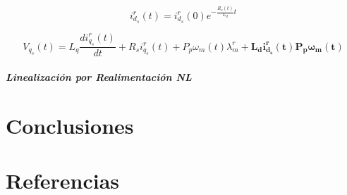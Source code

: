 \documentclass{article}
\begin{document}
\begin{enumerate}[label=\roman*.]
    \begin{equation}
        i_{d_{s}}^r(t) = i_{d_{s}}^r(0)e^{-\frac{R_{s}(t)}{L_{d}}t}
    \end{equation}

    \begin{equation}
        V_{q_{s}}(t) = L_{q}\frac{di_{q_{s}}^r(t)}{dt} + R_{s}i_{q_{s}}^r(t) + P_{p}\omega_{m}(t)\lambda_{m}^r + \mathbf{L_{d}i_{d_{s}}^r(t)P_{p}\omega_{m}(t)}
    \end{equation}

\end{enumerate}


\subsubsection*{Linealización por Realimentación NL}

\newpage
\part*{Conclusiones}

\newpage
\part*{Referencias}
\lipsum{}
\label{LastPage}    
\end{document}
